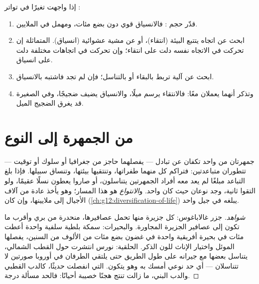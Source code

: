 \begin{method}\label{met:g12:selection-drift-speciation:which}
إذا واجهت تغيرًا في تواتر :
\begin{enumerate}
  \item قدّر حجم : فالانسياق قوي دون بضع مئات، ومهمل في
        الملايين.
  \item ابحث عن اتجاه يتتبع البيئة (انتقاء)، أو عن مشية عشوائية
        (انسياق).  المتماثلة إن تحركت في الاتجاه نفسه دلت على
        انتقاء؛ وإن تحركت في اتجاهات مختلفة دلت على انسياق.
  \item ابحث عن آلية تربط  بالبقاء أو بالتناسل؛ فإن لم تجد
        فاشتبه بالانسياق.
  \item وتذكر أنهما يعملان معًا: فالانتقاء يرسم ميلًا، والانسياق يضيف
        ضجيجًا، وفي  الصغيرة قد يغرق الضجيج الميل.
\end{enumerate}
\end{method}

\section{من الجمهرة إلى النوع}

\begin{proposition}[الانتواع]\label{prop:g12:selection-drift-speciation:speciation}
جمهرتان من  واحد تكفان عن تبادل  --- يفصلهما حاجز من
جغرافيا أو سلوك أو توقيت --- تتطوران متباعدتين: فتراكم كل منهما
طفراتها، وتنتقيها بيئتها، وتنساق سبيلها. فإذا بلغ التباعد مبلغًا لم
يعد معه أفراد الجمهرتين يتناسلون، أو صاروا يعطون نسلًا عقيمًا، ولو
التقوا ثانية، وجد نوعان حيث كان  واحد. و\emph{الانتواع}
هو هذا المسار؛ وهو يأخذ عادة من آلاف الأجيال إلى ملايينها، وإن كان
 (\cref{ch:g12:diversification-of-life}) يبلغه في
جيل واحد.
\end{proposition}
\begin{proof}[شواهد]
جزر غالاباغوس: كل جزيرة منها تحمل عصافيرها، منحدرة من  بري
وأقرب ما تكون إلى عصافير الجزيرة المجاورة. والبحيرات: سمكة بلطية سلفية
واحدة أعطت مئات  في بحيرة أفريقية واحدة في غضون بضع مئات من
الألوف من السنين، يفصلها الموئل واختيار الإناث للون الذكر. 
الحلقية:  نورس انتشرت حول القطب الشمالي، يتناسل بعضها مع جيرانه
على طول الطريق حتى يلتقي الطرفان في أوروبا صورتين لا تتناسلان --- أي
حد نوعي أمسك به وهو يتكون.  التي انفصلت حديثًا، كالدب القطبي
والدب البني، ما زالت تنتج هجنًا خصيبة أحيانًا: فالحد مسألة درجة.
\end{proof}

